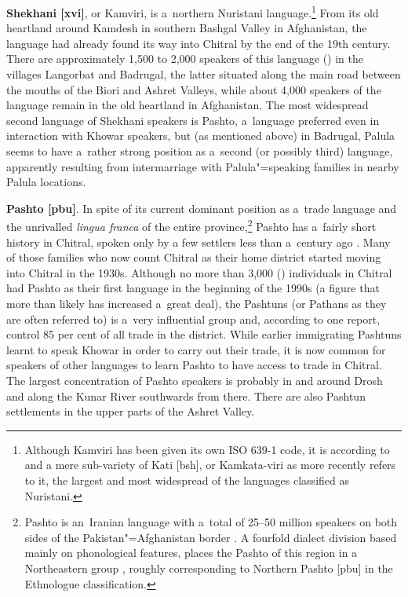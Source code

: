 \textbf{Shekhani [xvi]}, or Kamviri, is a~northern Nuristani language.\footnote{Although Kamviri has been given its own ISO 639-1 code, it is according to \citet[298]{strand1973} and \citet[104]{degener2002} a mere sub-variety of Kati [bsh], or Kamkata-viri as \citet{strand2001} more recently refers to it, the largest and most widespread of the languages classified as Nuristani.} From its old heartland around Kamdesh in southern Bashgal Valley in Afghanistan, the language had already found its way into Chitral by the end of the 19th century. There are approximately 1,500 to 2,000 speakers of this language (\citealt{decker1992a}) in the villages Langorbat and Badrugal, the latter situated along the main road between the mouths of the Biori and Ashret Valleys, while about 4,000 speakers of the language remain in the old heartland in Afghanistan. The most widespread second language of Shekhani speakers is Pashto, a~language preferred even in interaction with Khowar speakers, but (as mentioned above) in Badrugal, Palula seems to have a~rather strong position as a~second (or possibly third) language, apparently resulting from intermarriage with Palula"=speaking families in nearby Palula locations.


\textbf{Pashto [pbu]}. In spite of its current dominant position as a~trade language and the unrivalled \textit{lingua franca} of the entire province,\footnote{Pashto is an~Iranian language with a~total of 25--50 million speakers on both sides of the Pakistan"=Afghanistan border \citep[7--8]{david2013}. A fourfold dialect division based mainly on phonological features, places the Pashto of this region in a Northeastern group \citep[739--740]{elfenbein1997}, roughly corresponding to Northern Pashto [pbu] in the Ethnologue \citep{ethnologue2015} classification.} Pashto has a~fairly short history in Chitral, spoken only by a few settlers less than a~century ago \citep[67]{morgenstierne1932}. Many of those families who now count Chitral as their home district started moving into Chitral in the 1930s. Although no more than 3,000 (\citealt{decker1992a}) individuals in Chitral had Pashto as their first language in the beginning of the 1990s (a figure that more than likely has increased a~great deal), the Pashtuns (or Pathans as they are often referred to) is a~very influential group and, according to one report, control 85 per cent of all trade in the district. While earlier immigrating Pashtuns learnt to speak Khowar in order to carry out their trade, it is now common for speakers of other languages to learn Pashto to have access to trade in Chitral. The largest concentration of Pashto speakers is probably in and around Drosh and along the Kunar River southwards from there. There are also Pashtun settlements in the upper parts of the Ashret Valley. 


